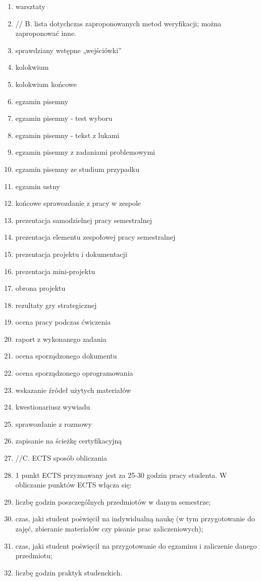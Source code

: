 \documentclass[12pt, a4paper]{article}
\begin{document}
\begin{enumerate}
  \item warsztaty
  \item // B. lista dotychczas zaproponowanych metod weryfikacji; można zaproponować inne.
  \item sprawdziany wstępne „wejściówki”
  \item kolokwium
  \item kolokwium końcowe
  \item egzamin pisemny
  \item egzamin pisemny - test wyboru
  \item egzamin pisemny - tekst z lukami
  \item egzamin pisemny z zadaniami problemowymi
  \item egzamin pisemny ze studium przypadku
  \item egzamin ustny
  \item końcowe sprawozdanie z pracy w zespole
  \item prezentacja samodzielnej pracy semestralnej
  \item prezentacja elementu zespołowej pracy semestralnej
  \item prezentacja projektu i dokumentacji
  \item prezentacja mini-projektu
  \item obrona projektu
  \item rezultaty gry strategicznej
  \item ocena pracy podczas ćwiczenia
  \item raport z wykonanego zadania
  \item ocena sporządzonego dokumentu
  \item ocena sporządzonego oprogramowania
  \item wskazanie źródeł użytych materiałów
  \item kwestionariusz wywiadu
  \item sprawozdanie z rozmowy
  \item zapisanie na ścieżkę certyfikacyjną
  \item //C. ECTS sposób obliczania
  \item 1 punkt ECTS przyznawany jest za 25-30 godzin pracy studenta. W obliczanie punktów ECTS włącza się:
  \item liczbę godzin poszczególnych przedmiotów w danym semestrze;
  \item czas, jaki student poświęcił na indywidualną naukę (w tym przygotowanie do zajęć, zbieranie materiałów czy pisanie prac zaliczeniowych);
  \item czas, jaki student poświęcił na przygotowanie do egzaminu i zaliczenie danego przedmiotu;
  \item liczbę godzin praktyk studenckich.
\end{enumerate}
\end{document}
